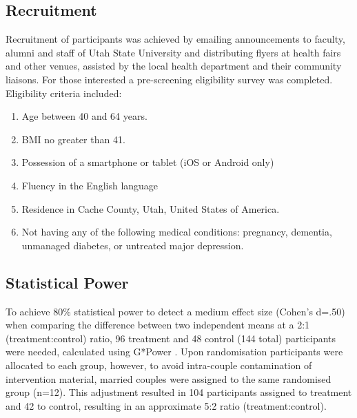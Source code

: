\subsection{Recruitment}
Recruitment of participants was achieved by emailing announcements to faculty, alumni and staff of Utah State University and distributing flyers at health fairs and other venues, assisted by the local health department and their community liaisons. For those interested a pre-screening eligibility survey was completed. Eligibility criteria included:
\begin{enumerate}[noitemsep,topsep=0pt,label=(\alph*)]
\item Age between 40 and 64 years.
\item BMI no greater than 41.
\item Possession of a smartphone or tablet (iOS or Android only)
\item Fluency in the English language
\item Residence in Cache County, Utah, United States of America.
\item Not having any of the following medical conditions: pregnancy, dementia, unmanaged diabetes, or untreated major depression.
\end{enumerate}

\subsection{Statistical Power}
To achieve 80\% statistical power to detect a medium effect size (Cohen's d=.50) when comparing the difference between two independent means at a 2:1 (treatment:control) ratio, 96 treatment and 48 control (144 total) participants were needed, calculated using G*Power \cite{Faul2007}. Upon randomisation participants were allocated to each group, however, to avoid intra-couple contamination of intervention material, married couples were assigned to the same randomised group (n=12). This adjustment resulted in 104 participants assigned to treatment and 42 to control, resulting in an approximate 5:2 ratio (treatment:control).

